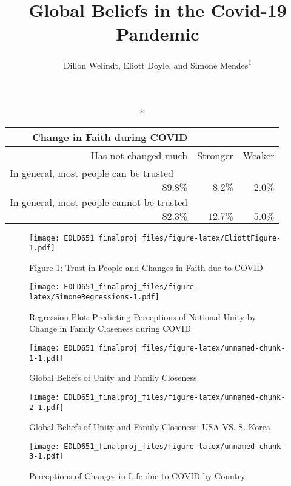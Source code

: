 \documentclass[
  english,
  man]{apa6}
\title{Global Beliefs in the Covid-19 Pandemic}
\author{Dillon Welindt, Eliott Doyle, and Simone Mendes\textsuperscript{1}}
\date{}
\affiliation{\vspace{0.5cm}\textsuperscript{1} University of Oregon}
\begin{document}
\maketitle

\captionsetup[table]{labelformat=empty,skip=1pt}
\begin{longtable}{rrr}
\caption*{
{\large Change in Faith during COVID}
} \\ 
\toprule
Has not changed much & Stronger & Weaker \\ 
\midrule
\multicolumn{1}{l}{In general, most people can be trusted} \\ 
\midrule
$89.8\%$ & $8.2\%$ & $2.0\%$ \\ 
\midrule
\multicolumn{1}{l}{In general, most people cannot be trusted} \\ 
$82.3\%$ & $12.7\%$ & $5.0\%$ \\ 
 \bottomrule
\end{longtable}

\begin{figure}
\centering
\texttt{[image: EDLD651\_finalproj\_files/figure-latex/EliottFigure-1.pdf]}
\caption{\label{fig:EliottFigure}Figure 1: Trust in People and Changes in Faith due to COVID}
\end{figure}

\begin{figure}
\centering
\texttt{[image: EDLD651\_finalproj\_files/figure-latex/SimoneRegressions-1.pdf]}
\caption{\label{fig:SimoneRegressions}Regression Plot: Predicting Perceptions of National Unity by Change in Family Closeness during COVID}
\end{figure}

\begin{figure}
\centering
\texttt{[image: EDLD651\_finalproj\_files/figure-latex/unnamed-chunk-1-1.pdf]}
\caption{\label{fig:unnamed-chunk-1}Global Beliefs of Unity and Family Closeness}
\end{figure}

\begin{figure}
\centering
\texttt{[image: EDLD651\_finalproj\_files/figure-latex/unnamed-chunk-2-1.pdf]}
\caption{\label{fig:unnamed-chunk-2}Global Beliefs of Unity and Family Closeness: USA VS. S. Korea}
\end{figure}

\begin{figure}
\centering
\texttt{[image: EDLD651\_finalproj\_files/figure-latex/unnamed-chunk-3-1.pdf]}
\caption{\label{fig:unnamed-chunk-3}Perceptions of Changes in Life due to COVID by Country}
\end{figure}
\end{document}
